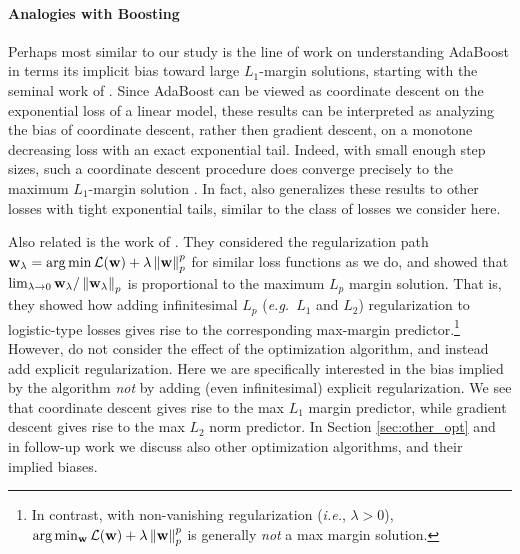 \documentclass[twoside,11pt,english]{article}
\newcommand{\norm}[1]{\left\lVert{#1}\right\rVert}
\begin{document}
\paragraph{Analogies with Boosting}  Perhaps most similar to our study is the line of work on understanding AdaBoost in terms its implicit bias toward large $L_1$-margin solutions, starting with the seminal work of \cite{schapire1998boosting}.  Since AdaBoost can be viewed as coordinate descent on the exponential loss of a linear model, these results can be interpreted as analyzing the bias of coordinate descent, rather then gradient descent, on a monotone decreasing loss with an exact exponential tail.  Indeed, with small enough step sizes, such a coordinate descent procedure does converge precisely to the maximum $L_1$-margin solution \citep{zhang2005boosting,telgarsky2013margins}.  In fact, \cite{telgarsky2013margins} also generalizes these results to other losses with tight exponential tails, similar to the class of losses we consider here.

Also related is the work of \citet{Rosset2004}.
They considered the regularization path $\w_{\lambda}=\arg\min\mathcal{L}(\w)+\lambda\norm{\w}_{p}^{p}$
for similar loss functions as we do, and showed that $\lim_{\lambda\rightarrow0}\w_{\lambda}/\norm{\w_{\lambda}}_{p}$
is proportional to the maximum $L_{p}$ margin solution.  That is, they showed how adding infinitesimal $L_p$ (\emph{e.g.}~$L_1$ and $L_2$) regularization to logistic-type losses gives rise to the corresponding max-margin predictor.\footnote{In contrast, with non-vanishing regularization (\emph{i.e.}, $\lambda>0$), $\arg\min_{\w}\mathcal{L}(\w)+\lambda\norm{\w}_{p}^{p}$ is generally \emph{not} a max margin solution.} However, \citeauthor{Rosset2004}
do not consider the effect of the optimization algorithm, and instead
add explicit regularization. Here we are specifically interested
in the bias implied by the algorithm {\em not} by adding (even
infinitesimal) explicit regularization.  We see that coordinate descent gives rise to the max $L_1$ margin predictor, while gradient descent gives rise to the max $L_2$ norm predictor.  In Section \ref{sec:other_opt} and in follow-up work \citep{gunasekar2018characterizing} we discuss also other optimization algorithms, and their implied biases.
\end{document}
